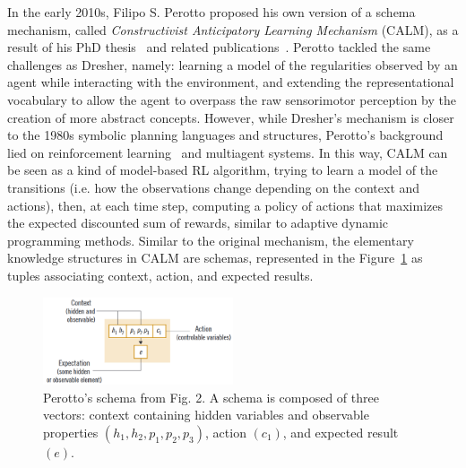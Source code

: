 \documentclass[runningheads]{llncs}
\begin{document}
In the early 2010s, Filipo S. Perotto proposed his own version of a schema mechanism, called \textit{Constructivist Anticipatory Learning Mechanism} (CALM), as a result of his PhD thesis~\cite{Perotto:2010:UFRGS,Perotto:2010:INP} and related publications~\cite{Perotto:2013:CF,Perotto:2006:SGAI,Perotto:2006:AAMAS,Perotto:2007:EpiRob}.
Perotto tackled the same challenges as Dresher, namely: learning a model of the regularities observed by an agent while interacting with the environment, and extending the representational vocabulary to allow the agent to overpass the raw sensorimotor perception by the creation of more abstract concepts.
However, while Dresher's mechanism is closer to the 1980s symbolic planning languages and structures, Perotto's background lied on reinforcement learning~\cite{Sutton:2018} and multiagent systems.
In this way, CALM can be seen as a kind of model-based RL algorithm, trying to learn a model of the transitions (i.e. how the observations change depending on the context and actions), then, at each time step, computing a policy of actions that maximizes the expected discounted sum of rewards, similar to adaptive dynamic programming methods.
Similar to the original mechanism, the elementary knowledge structures in CALM are schemas, represented in the Figure~\ref{fig:perotto_schema} as tuples associating context, action, and expected results.
%
\begin{figure}
	\centering
	\includegraphics[width=0.5\textwidth]{Figure_perotto.png}
	\caption{Perotto's schema from \cite{Perotto:2013:CF} Fig. 2.
		A schema is composed of three vectors: context containing hidden variables and observable properties $(h_1, h_2, p_1, p_2, p_3)$, action $(c_1)$, and expected result $(e)$. } 
	\label{fig:perotto_schema}
\end{figure}
\end{document}
